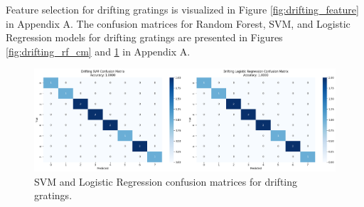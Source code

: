 \documentclass[10pt,twocolumn]{article}
\begin{document}
Feature selection for drifting gratings is visualized in Figure \ref{fig:drifting_feature} in Appendix A. The confusion matrices for Random Forest, SVM, and Logistic Regression models for drifting gratings are presented in Figures \ref{fig:drifting_rf_cm} and \ref{fig:drifting_svm_logr_cm} in Appendix A.

\begin{figure}[H]
  \centering
  \includegraphics[width=\linewidth]{report_images/drifting_SVM_LogR_confusion_matrix.png}
  \caption{SVM and Logistic Regression confusion matrices for drifting gratings.}
  \label{fig:drifting_svm_logr_cm}
\end{figure}
\end{document}
